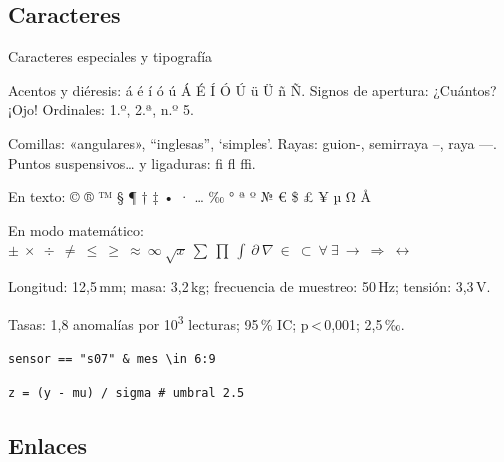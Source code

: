 \documentclass[aspectratio=169,9pt]{beamer}
\begin{document}
\subsection{Caracteres}

\begin{frame}{Caracteres especiales y tipografía}
\begin{twocols}

  Acentos y diéresis: á é í ó ú Á É Í Ó Ú ü Ü ñ Ñ.
  Signos de apertura: ¿Cuántos? ¡Ojo!
  Ordinales: 1.º, 2.ª, n.º 5.

  Comillas: «angulares», “inglesas”, ‘simples’.
  Rayas: guion-, semirraya –, raya —.
  Puntos suspensivos… y ligaduras: fi fl ffi.


  En texto: © ® ™ § ¶ † ‡ • · … ‰ ° ª º № € \$ £ ¥ µ Ω Å

  En modo matemático:
  $\pm\ \times\ \div\ \neq\ \leq\ \geq\ \approx\ \infty\ \sqrt{x}\ \sum\ \prod\
  \int\ \partial\ \nabla\ \in\ \subset\ \forall\ \exists\ \to\ \Rightarrow\
  \leftrightarrow$
\nextcol

  Longitud: 12,5\,mm; masa: 3,2\,kg; frecuencia de muestreo: 50\,Hz;
  tensión: 3,3\,V.

  Tasas: 1,8 anomalías por 10\textsuperscript{3} lecturas;
  95\,\% IC; p\,<\,0,001; 2,5\,‰.


  \texttt{sensor == "s07" \& mes \textbackslash in 6:9}

  \texttt{z = (y - mu) / sigma \# umbral 2.5}
\end{twocols}
\end{frame}

\subsection{Enlaces}
\end{document}
